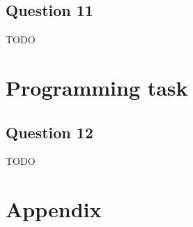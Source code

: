 \documentclass{article}
\begin{document}
\subsection{Question 11}
TODO

\section{Programming task}

\subsection{Question 12}
TODO

\newpage
\appendix

\section{Appendix}
\end{document}
